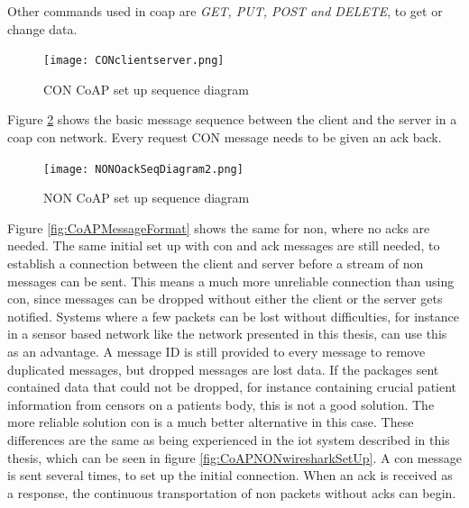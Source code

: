 \noindent Other commands used in \gls{coap} are \textit{GET, PUT, POST and DELETE}, to get or change data. 



\begin{figure}[ht]
    \centering
    \texttt{[image: CONclientserver.png]}    
    \caption{CON CoAP set up sequence diagram}
    \label{fig:CONclientserver}
\end{figure}

\noindent Figure \ref{fig:NONOackSeqDiagram} shows the basic message sequence between the client and the server in a \gls{coap} \gls{con} network. Every request CON message needs to be given an ack back. 

\begin{figure}[ht]
    \centering
    \texttt{[image: NONOackSeqDiagram2.png]}    
    \caption{NON CoAP set up sequence diagram}
    \label{fig:NONOackSeqDiagram}
\end{figure}


\noindent Figure \ref{fig:CoAPMessageFormat} shows the same for \gls{non}, where no \glspl{ack} are needed. The same initial set up with con and ack messages are still needed, to establish a connection between the client and server before a stream of \gls{non} messages can be sent. This means a much more unreliable connection than using \gls{con}, since messages can be dropped without either the client or the server gets notified. Systems where a few packets can be lost without difficulties, for instance in a sensor based network like the network presented in this thesis, can use this as an advantage. A message ID is still provided to every message to remove duplicated messages, but dropped messages are lost data. If the packages sent contained data that could not be dropped, for instance containing crucial patient information from censors on a patients body, this is not a good solution. The more reliable solution \gls{con} is a much better alternative in this case. These differences are the same as being experienced in the \gls{iot} system described in this thesis, which can be seen in figure \ref{fig:CoAPNONwiresharkSetUp}. A \gls{con} message is sent several times, to set up the initial connection. When an \gls{ack} is received as a response, the continuous transportation of \gls{non} packets without \glspl{ack} can begin. 

